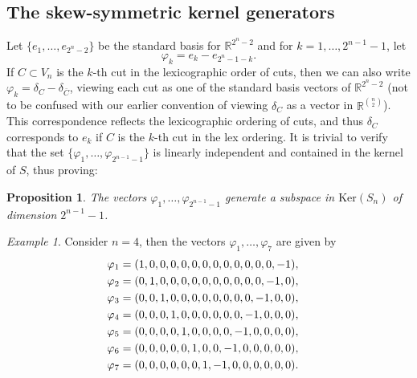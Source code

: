 \documentclass[12pt]{amsart}
\numberwithin{theorem}{section}
\newtheorem{proposition}[theorem]{Proposition}
\theoremstyle{remark}
\newtheorem{example}[theorem]{Example}
\newcommand{\kerr}{\text{Ker}}
\begin{document}
\subsection{The skew-symmetric kernel generators}
Let $\{e_1, \dots, e_{2^n-2}\}$ be the standard basis for $\mathbb R^{2^n-2}$ and for $k=1,\dots, 2^{n-1}-1$, let 
\begin{equation} \label{The skew-symmetric generators of the kernel of the full cut matrix}
\varphi_k = e_k - e_{2^n-1-k}.
\end{equation} 
If $C\subset V_n$ is the $k$-th cut in the lexicographic order of cuts, then we can also write $\varphi_ k  = \delta_C - \delta_{\bar C}$, viewing each cut as one of the standard basis vectors of $\mathbb R^{2^n-2}$ (not to be confused with our earlier convention of viewing $\delta_C$ as a vector in $\mathbb R^{n\choose 2}$). This correspondence reflects the lexicographic ordering of cuts, and thus $\delta_C$ corresponds to $e_k$ if $C$ is the $k$-th cut in the lex ordering. It is trivial to verify that the set $\{\varphi_1, \dots, \varphi_{2^{n-1}-1}\}$ is linearly independent and contained in the kernel of $S$, thus proving:
\begin{proposition} \label{Proposition generating the skew-symmetric kernel elements}
The vectors $\varphi_1, \dots, \varphi_{2^{n-1}-1}$ generate a subspace in $\kerr (S_n)$ of dimension $2^{n-1}-1$. 
\end{proposition}
\begin{example}
Consider $n=4$, then the vectors $\varphi_1, \dots, \varphi_{7}$ are given by 
\begin{align*}
\varphi_1 & = (1,0,0,0,0,0,0,0,0,0,0,0,0,-1), \cr 
\varphi_2 & = (0,1,0,0,0,0,0,0,0,0,0,0,-1,0), \cr
\varphi_3 & = (0,0,1,0,0,0,0,0,0,0,0,-1,0,0), \cr
\varphi_4 & = (0,0,0,1,0,0,0,0,0,0,-1,0,0,0), \cr
\varphi_5 & = (0,0,0,0,1,0,0,0,0,-1,0,0,0,0), \cr
\varphi_6 & = (0,0,0,0,0,1,0,0,-1,0,0,0,0,0), \cr
\varphi_7 & = (0,0,0,0,0,0,1,-1,0,0,0,0,0,0).
\end{align*}
\end{example}
\end{document}
